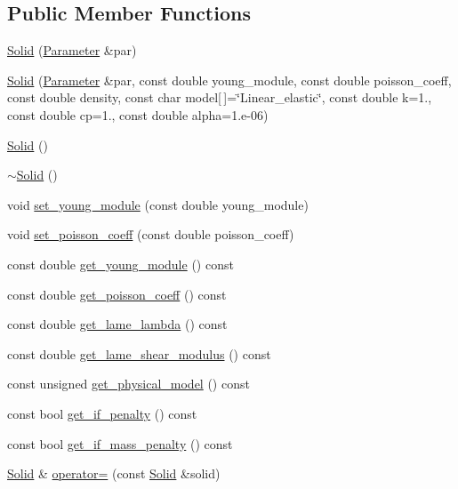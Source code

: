 \subsection*{Public Member Functions}
\begin{DoxyCompactItemize}
\item 
\mbox{\hyperlink{classfemus_1_1_solid_a07969055ed742f25e4056549bb068cb4}{Solid}} (\mbox{\hyperlink{classfemus_1_1_parameter}{Parameter}} \&par)
\item 
\mbox{\hyperlink{classfemus_1_1_solid_a0d8044c8b1ef2b972975dfb5d7378b9a}{Solid}} (\mbox{\hyperlink{classfemus_1_1_parameter}{Parameter}} \&par, const double young\+\_\+module, const double poisson\+\_\+coeff, const double density, const char model\mbox{[}$\,$\mbox{]}=\char`\"{}Linear\+\_\+elastic\char`\"{}, const double k=1., const double cp=1., const double alpha=1.e-\/06)
\item 
\mbox{\hyperlink{classfemus_1_1_solid_a2d78d871f3e7af6d85508b08d32d82b0}{Solid}} ()
\item 
\mbox{\hyperlink{classfemus_1_1_solid_a6df9755d69a4b107891c8eea67425270}{$\sim$\+Solid}} ()
\item 
void \mbox{\hyperlink{classfemus_1_1_solid_afdf6ba9c09e68bfc8e3d995eb039b311}{set\+\_\+young\+\_\+module}} (const double young\+\_\+module)
\item 
void \mbox{\hyperlink{classfemus_1_1_solid_a1e30ce159ef4011c26fdfe3dfe0f05a0}{set\+\_\+poisson\+\_\+coeff}} (const double poisson\+\_\+coeff)
\item 
const double \mbox{\hyperlink{classfemus_1_1_solid_a1a27599fb327424255b0823dcddd863a}{get\+\_\+young\+\_\+module}} () const
\item 
const double \mbox{\hyperlink{classfemus_1_1_solid_a3d971cfb0d2a1810e6b31830f1f4b900}{get\+\_\+poisson\+\_\+coeff}} () const
\item 
const double \mbox{\hyperlink{classfemus_1_1_solid_a25307ed3e65fea474b2d74b130348e4b}{get\+\_\+lame\+\_\+lambda}} () const
\item 
const double \mbox{\hyperlink{classfemus_1_1_solid_a5f3228eab52c343a13167eaf73f568bc}{get\+\_\+lame\+\_\+shear\+\_\+modulus}} () const
\item 
const unsigned \mbox{\hyperlink{classfemus_1_1_solid_a19ca2da625aede63d5277cb034584718}{get\+\_\+physical\+\_\+model}} () const
\item 
const bool \mbox{\hyperlink{classfemus_1_1_solid_a032c01f0f6e345f2818a7ffe24bad883}{get\+\_\+if\+\_\+penalty}} () const
\item 
const bool \mbox{\hyperlink{classfemus_1_1_solid_a5215514d8c35970cc90a4ac190dcebe9}{get\+\_\+if\+\_\+mass\+\_\+penalty}} () const
\item 
\mbox{\hyperlink{classfemus_1_1_solid}{Solid}} \& \mbox{\hyperlink{classfemus_1_1_solid_a6fa24eaf6a7378872f2cd9b440f72a9f}{operator=}} (const \mbox{\hyperlink{classfemus_1_1_solid}{Solid}} \&solid)
\end{DoxyCompactItemize}
